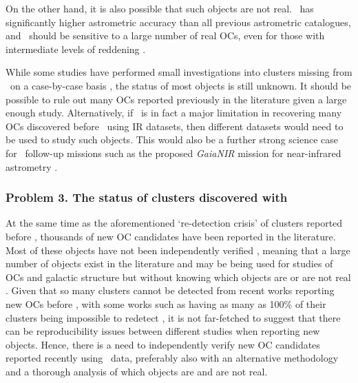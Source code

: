 On the other hand, it is also possible that such objects are not real. \gaia\ has significantly higher astrometric accuracy than all previous astrometric catalogues, and \gaia\ should be sensitive to a large number of real OCs, even for those with intermediate levels of reddening \citep{cantat-gaudin_clusters_2020}. 

While some studies have performed small investigations into clusters missing from \gaia\ on a case-by-case basis \citep[e.g.][]{cantat-gaudin_clusters_2020,piatti_catching_2023}, the status of most objects is still unknown. It should be possible to rule out many OCs reported previously in the literature given a large enough study. Alternatively, if \gaia\ is in fact a major limitation in recovering many OCs discovered before \gaia\ using IR datasets, then different datasets would need to be used to study such objects. This would also be a further strong science case for \gaia\ follow-up missions such as the proposed \emph{GaiaNIR} mission for near-infrared astrometry \citep{hobbs_gaianir_combining_2016}.


\subsubsection{Problem 3. The status of clusters discovered with \gaia}
\label{sec:intro:aims:issues:post_gaia}

At the same time as the aforementioned `re-detection crisis' of clusters reported before \gaia, thousands of new OC candidates have been reported in the literature. Most of these objects have not been independently verified \citep{cantat-gaudin_milky_2022}, meaning that a large number of objects exist in the literature and may be being used for studies of OCs and galactic structure but without knowing which objects are or are not real \citep[e.g.][]{anders_milky_2020,castro-ginard_milky_2021}. Given that so many clusters cannot be detected from recent works reporting new OCs before \gaia, with some works such as \citep{scholz_global_2015} having as many as 100\% of their clusters being impossible to redetect \citep{cantat-gaudin_gaia_2018}, it is not far-fetched to suggest that there can be reproducibility issues between different studies when reporting new objects. Hence, there is a need to independently verify new OC candidates reported recently using \gaia\ data, preferably also with an alternative methodology and a thorough analysis of which objects are and are not real.


